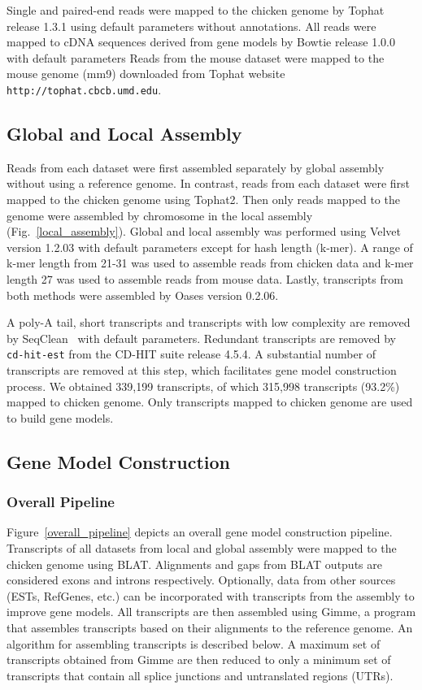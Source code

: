 \documentclass[10pt]{article}
\begin{document}
Single and paired-end reads were mapped to the chicken genome by
Tophat\cite{Trapnell:2009dp} release 1.3.1 using default parameters without
annotations.  All reads were mapped to cDNA sequences derived from gene models
by Bowtie\cite{Langmead:2009fv} release 1.0.0 with default parameters Reads from the
mouse dataset were mapped to the mouse genome (mm9) downloaded from Tophat
website \texttt{http://tophat.cbcb.umd.edu}.

\subsection*{Global and Local Assembly}

Reads from each dataset were first assembled separately by global assembly
without using a reference genome.  In contrast, reads from each dataset were
first mapped to the chicken genome using Tophat2.  Then only reads mapped to
the genome were assembled by chromosome in the local assembly
(Fig.~\ref{local_assembly}).  Global and local assembly was performed using
Velvet version 1.2.03\cite{Zerbino:2008vu} with default parameters except for
hash length (k-mer).  A range of k-mer length from 21-31 was used to assemble
reads from chicken data and k-mer length 27 was used to assemble reads from
mouse data.  Lastly, transcripts from both methods were assembled by Oases
version 0.2.06\cite{Schulz:2012je}.

A poly-A tail, short transcripts and transcripts with low complexity are
removed by SeqClean~\cite{seqclean} with default parameters.  Redundant
transcripts are removed by \texttt{cd-hit-est} from the CD-HIT
suite\cite{Li:2006hr} release 4.5.4.  A substantial number of transcripts are
removed at this step, which facilitates gene model construction process.  We
obtained 339,199 transcripts, of which 315,998 transcripts (93.2\%) mapped to
chicken genome.  Only transcripts mapped to chicken genome are used to build
gene models.

\subsection*{Gene Model Construction}

\subsubsection*{Overall Pipeline}

Figure~\ref{overall_pipeline} depicts an overall gene model construction
pipeline.  Transcripts of all datasets from local and global assembly were
mapped to the chicken genome using BLAT\cite{Kent:2002tv}. Alignments and gaps
from BLAT outputs are considered exons and introns respectively.  Optionally,
data from other sources (ESTs, RefGenes, etc.) can be incorporated with
transcripts from the assembly to improve gene models.  All transcripts are then
assembled using Gimme, a program that assembles transcripts based on their
alignments to the reference genome.  An algorithm for assembling transcripts is
described below.  A maximum set of transcripts obtained from Gimme are then
reduced to only a minimum set of transcripts that contain all splice junctions
and untranslated regions (UTRs).
\end{document}
